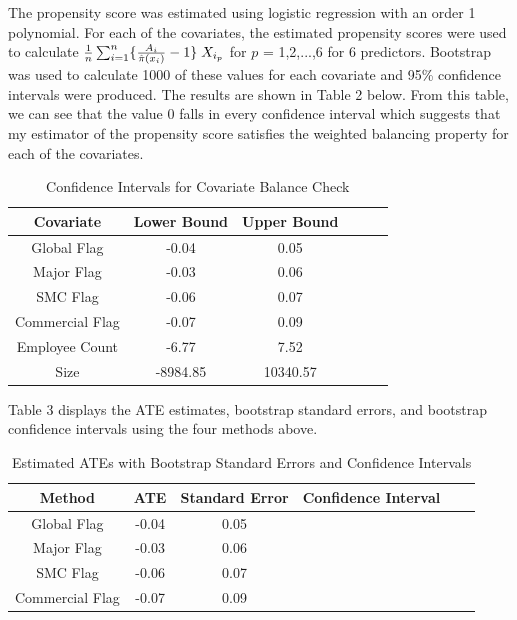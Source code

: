 \documentclass[10pt]{article}
\begin{document}
The propensity score was estimated using logistic regression with an order 1 polynomial. For each of the covariates, the estimated propensity scores were used to calculate $\frac{1}{n}\sum_{i=1}^{n}\{\frac{A_i}{\hat{\pi}(x_i)}-1\}\hspace{0.1cm}X_{i_{p}}$ for $p$ = 1,2,...,6 for 6 predictors. Bootstrap was used to calculate 1000 of these values for each covariate and 95\% confidence intervals were produced. The results are shown in Table 2 below. From this table, we can see that the value 0 falls in every confidence interval which suggests that my estimator of the propensity score satisfies the weighted balancing property for each of the covariates.

\begin{table}[htp]
\centering
\caption{Confidence Intervals for Covariate Balance Check}\medskip
\begin{tabular}{cccccc}
\toprule
Covariate             & Lower Bound            & Upper Bound   \\
\midrule
Global Flag           & -0.04                  & 0.05        \\
Major Flag            & -0.03                  & 0.06        \\
SMC Flag              & -0.06                  & 0.07        \\
Commercial Flag       & -0.07                  & 0.09        \\
Employee Count        & -6.77                  & 7.52        \\
Size                  & -8984.85               & 10340.57        \\
\bottomrule
\end{tabular}
\end{table}

Table 3 displays the ATE estimates, bootstrap standard errors, and bootstrap confidence intervals using the four methods above. 

\begin{table}[htp]
\centering
\caption{Estimated ATEs with Bootstrap Standard Errors and Confidence Intervals}\medskip
\begin{tabular}{cccccc}
\toprule
Method                & ATE                    & Standard Error        & Confidence Interval  \\
\midrule
Global Flag           & -0.04                  & 0.05                  &  \\
Major Flag            & -0.03                  & 0.06                  &  \\
SMC Flag              & -0.06                  & 0.07                  &  \\
Commercial Flag       & -0.07                  & 0.09                  &   \\
\bottomrule
\end{tabular}
\end{table}
\end{document}
